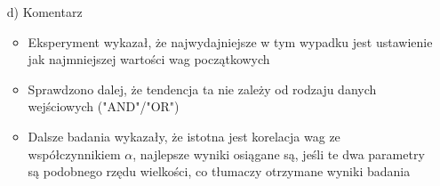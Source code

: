 \documentclass[17pt]{article}
\begin{document}
\begin{enumerate}
\item[d)] Komentarz

\begin{itemize}
\item Eksperyment wykazał, że najwydajniejsze w tym wypadku jest ustawienie jak najmniejszej wartości wag początkowych
\item Sprawdzono dalej, że tendencja ta nie zależy od rodzaju danych wejściowych ("AND"/"OR")
\item Dalsze badania wykazały, że istotna jest korelacja wag ze współczynnikiem $\alpha$, najlepsze wyniki osiągane są, jeśli te dwa parametry są podobnego rzędu wielkości, co tłumaczy otrzymane wyniki badania
\end{itemize}

\end{enumerate}
\end{document}
